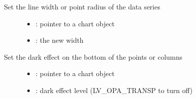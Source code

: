 \documentclass[letterpaper,10pt,english]{sphinxmanual}
\begin{document}

\begin{fulllineitems}
\label{\detokenize{object-types/chart:_CPPv425lv_chart_set_series_widthP8lv_obj_t10lv_coord_t}}%
\pysigstartmultiline
{}\label{\detokenize{object-types/chart:lv__chart_8h_1a9424b4a22df978997e476fd54c621eac}}%
\pysigstopmultiline
Set the line width or point radius of the data series \begin{description}
\item[{}] \leavevmode\begin{itemize}
\item {} 
: pointer to a chart object 

\item {} 
: the new width 

\end{itemize}

\end{description}


\end{fulllineitems}


\begin{fulllineitems}
\label{\detokenize{object-types/chart:_CPPv427lv_chart_set_series_darkingP8lv_obj_t8lv_opa_t}}%
\pysigstartmultiline
{}\label{\detokenize{object-types/chart:lv__chart_8h_1ab72fbf9eac9cb3517d2cdaedce263163}}%
\pysigstopmultiline
Set the dark effect on the bottom of the points or columns \begin{description}
\item[{}] \leavevmode\begin{itemize}
\item {} 
: pointer to a chart object 

\item {} 
: dark effect level (LV\_OPA\_TRANSP to turn off) 

\end{itemize}

\end{description}


\end{fulllineitems}
\end{document}
